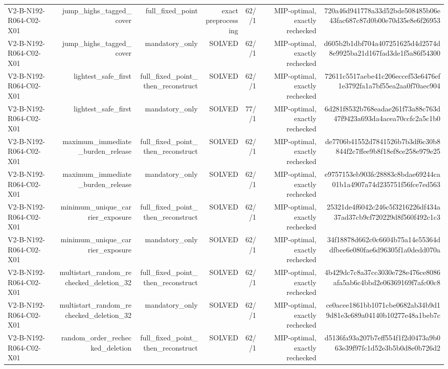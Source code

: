 {\begin{longtable}{lrrrrrr}
V2-B-N192-R064-C02-X01 & jump\_highs\_tagged\_cover & full\_fixed\_point & exact preprocessing & 62//1 & MIP-optimal, exactly rechecked & 720a46d941778a33d52bde508485b06e43fac687c87d0b00e70d35e8e6f26953 \\
V2-B-N192-R064-C02-X01 & jump\_highs\_tagged\_cover & mandatory\_only & SOLVED & 62//1 & MIP-optimal, exactly rechecked & d605b2b1dbf704a407251625d4d2574d8e9925ba21d167fad3de1f5a86f54300 \\
V2-B-N192-R064-C02-X01 & lightest\_safe\_first & full\_fixed\_point\_then\_reconstruct & SOLVED & 62//1 & MIP-optimal, exactly rechecked & 72611c5517aebe41c206eccef53e6476ef1e3792fa1a7bf55ea2aa0f70aec904 \\
V2-B-N192-R064-C02-X01 & lightest\_safe\_first & mandatory\_only & SOLVED & 77//1 & MIP-optimal, exactly rechecked & 6d281f8532b768eadae261f73a88c763d47f9423a693da4acea70ccfc2a5c1b0 \\
V2-B-N192-R064-C02-X01 & maximum\_immediate\_burden\_release & full\_fixed\_point\_then\_reconstruct & SOLVED & 62//1 & MIP-optimal, exactly rechecked & de7706b41552d7841526b7b3df6c30b8844f2c7ffee9b8f18ef8ce258e979e25 \\
V2-B-N192-R064-C02-X01 & maximum\_immediate\_burden\_release & mandatory\_only & SOLVED & 62//1 & MIP-optimal, exactly rechecked & e9757153eb903fc28883c8bdae69244ca01b1a4907a74d235751f56fce7ed563 \\
V2-B-N192-R064-C02-X01 & minimum\_unique\_carrier\_exposure & full\_fixed\_point\_then\_reconstruct & SOLVED & 62//1 & MIP-optimal, exactly rechecked & 25321de4f6042c246c5f3216226df434a37ad37cb9cf720229d8f560f492c1c3 \\
V2-B-N192-R064-C02-X01 & minimum\_unique\_carrier\_exposure & mandatory\_only & SOLVED & 62//1 & MIP-optimal, exactly rechecked & 34f18878d662c0c6604b75a14e55364ddfbee6e080fae6d96305f1a0dedd070a \\
V2-B-N192-R064-C02-X01 & multistart\_random\_rechecked\_deletion\_32 & full\_fixed\_point\_then\_reconstruct & SOLVED & 62//1 & MIP-optimal, exactly rechecked & 4b429dc7c8a37cc3030e728e476ce8086afa5ab6c4bbd2e06369169f7afc00c8 \\
V2-B-N192-R064-C02-X01 & multistart\_random\_rechecked\_deletion\_32 & mandatory\_only & SOLVED & 62//1 & MIP-optimal, exactly rechecked & ce0acee1861bb1071cbe0682ab34b9d19d81e3c689a04140b10277e48a1beb7c \\
V2-B-N192-R064-C02-X01 & random\_order\_rechecked\_deletion & full\_fixed\_point\_then\_reconstruct & SOLVED & 62//1 & MIP-optimal, exactly rechecked & d5136fa93a207b7eff554f1f2d0473a9b063e39f97fc1d52e3b5b0d8e0b726d2 \\

\end{longtable}}
